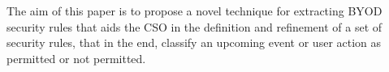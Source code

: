 \documentclass[a4paper,10pt,twocolumn,preprint,3p]{elsarticle}
\begin{document}
The aim of this paper is to propose a novel technique for extracting
BYOD security rules that aids the CSO in the definition and refinement
of a set of security rules, that in the end, classify an upcoming
event or user action as permitted or not permitted. %
\end{document}
